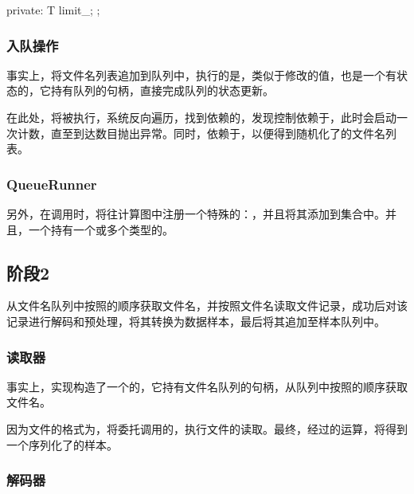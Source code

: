\begin{content}
\begin{leftbar}
\begin{c++}
{private:
  T limit_;
};
\end{c++}
\end{leftbar}

\subsubsection{入队操作}

事实上，将文件名列表追加到队列中，执行的是，类似于修改的值，也是一个有状态的，它持有队列的句柄，直接完成队列的状态更新。

在此处，将被执行，系统反向遍历，找到依赖的，发现控制依赖于，此时会启动一次计数，直至到达数目抛出异常。同时，依赖于，以便得到随机化了的文件名列表。

\subsubsection{QueueRunner}

另外，在调用时，将往计算图中注册一个特殊的：，并且将其添加到集合中。并且，一个持有一个或多个类型的。

\subsection{阶段2}

从文件名队列中按照的顺序获取文件名，并按照文件名读取文件记录，成功后对该记录进行解码和预处理，将其转换为数据样本，最后将其追加至样本队列中。

\subsubsection{读取器}

事实上，实现构造了一个的，它持有文件名队列的句柄，从队列中按照的顺序获取文件名。

因为文件的格式为，将委托调用的，执行文件的读取。最终，经过的运算，将得到一个序列化了的样本。

\subsubsection{解码器}


\end{content}
